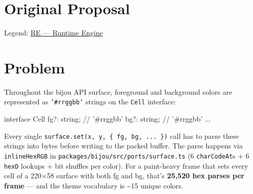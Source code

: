 \section{Original Proposal}\label{record-367-original-proposal}

Legend: \href{https://github.com/flyingrobots/bijou/blob/1853ad902f6bf219326409e7f743a5a1d6517dbc/docs/method/legends/RE-runtime-engine.md}{RE --- Runtime Engine}

\section{Problem}\label{record-367-problem}

Throughout the bijou API surface, foreground and background colors are represented as \texttt{'\allowbreak{}\#\allowbreak{}r\allowbreak{}r\allowbreak{}g\allowbreak{}g\allowbreak{}b\allowbreak{}b\allowbreak{}'} strings on the \texttt{C\allowbreak{}e\allowbreak{}l\allowbreak{}l} interface:

\begin{CodeBlock}
interface Cell {
  fg?: string;  // '#rrggbb'
  bg?: string;  // '#rrggbb'
  ...
}
\end{CodeBlock}

Every single \texttt{s\allowbreak{}u\allowbreak{}r\allowbreak{}f\allowbreak{}a\allowbreak{}c\allowbreak{}e\allowbreak{}.\allowbreak{}s\allowbreak{}e\allowbreak{}t\allowbreak{}(\allowbreak{}x\allowbreak{},\allowbreak{} \allowbreak{}y\allowbreak{},\allowbreak{} \allowbreak{}\{\allowbreak{} \allowbreak{}f\allowbreak{}g\allowbreak{},\allowbreak{} \allowbreak{}b\allowbreak{}g\allowbreak{},\allowbreak{} \allowbreak{}.\allowbreak{}.\allowbreak{}.\allowbreak{} \allowbreak{}\}\allowbreak{})} call has to parse these strings into bytes before writing to the packed buffer. The parse happens via \texttt{i\allowbreak{}n\allowbreak{}l\allowbreak{}i\allowbreak{}n\allowbreak{}e\allowbreak{}H\allowbreak{}e\allowbreak{}x\allowbreak{}R\allowbreak{}G\allowbreak{}B} in \texttt{p\allowbreak{}a\allowbreak{}c\allowbreak{}k\allowbreak{}a\allowbreak{}g\allowbreak{}e\allowbreak{}s\allowbreak{}/\allowbreak{}b\allowbreak{}i\allowbreak{}j\allowbreak{}o\allowbreak{}u\allowbreak{}/\allowbreak{}s\allowbreak{}r\allowbreak{}c\allowbreak{}/\allowbreak{}p\allowbreak{}o\allowbreak{}r\allowbreak{}t\allowbreak{}s\allowbreak{}/\allowbreak{}s\allowbreak{}u\allowbreak{}r\allowbreak{}f\allowbreak{}a\allowbreak{}c\allowbreak{}e\allowbreak{}.\allowbreak{}t\allowbreak{}s} (6 \texttt{c\allowbreak{}h\allowbreak{}a\allowbreak{}r\allowbreak{}C\allowbreak{}o\allowbreak{}d\allowbreak{}e\allowbreak{}A\allowbreak{}t}s + 6 \texttt{h\allowbreak{}e\allowbreak{}x\allowbreak{}D} lookups + bit shuffles per color). For a paint-heavy frame that sets every cell of a 220×58 surface with both fg and bg, that's \textbf{25,520 hex parses per frame} --- and the theme vocabulary is \textasciitilde15 unique colors.

